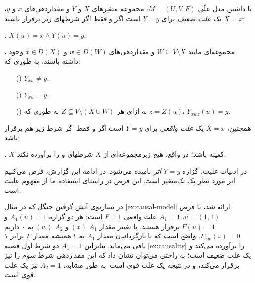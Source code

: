 \begin{definition}\label{def:causality}
  با داشتن مدل علّی
  $M=(U,V,F)$،
  مجموعه متغیرهای
  $X$ و $Y$
  و مقداردهی‌های
  $x$ و $y$،
  $X=x$
  یک
  \textit{علت ضعیف}
  برای
  $Y=y$
  است اگر و فقط اگر شرطهای زیر برقرار باشند:

  \textbf{.} $X(u)=x \wedge Y(u)=y$.

  \textbf{.}
  مجموعه‌ای مانند
  $W \subseteq V \setminus X$
  و مقداردهی‌های
  $w \in D(W)$ و $\bar{x} \in D(X)$
  وجود داشته باشند، به طوری که:
  \begin{itemize}
    \item[(\lr{a})] $Y_{\bar{x}w} \neq y$.
    \item[(\lr{b})] $Y_{xw}=y$.
    \item[(\lr{c})]
    به ازای هر
    $Z \subseteq V \setminus (X \cup W)$
    به طوری که
    $z = Z(u)$،
    $Y_{xwz}(u)=y$.
  \end{itemize}

  همچنین،
  $X=x$
  یک
  \textit{علت واقعی}
  برای
  $Y=y$
  است اگر و فقط اگر شرط زیر هم برقرار باشد:
  
  \textbf{.} $X$
  کمینه باشد؛ در واقع، هیچ زیرمجموعه‌ای از
  $X$
  شرطهای
   و 
  را برآورده نکند.
\end{definition}

در ادبیات علیت، گزاره
$Y=y$
\textit{اثر}
نامیده می‌شود.
در ادامه این گزارش، فرض می‌کنیم اثر مورد نظر
یک تک‌متغیر است. این فرض در راستای استفاده ما
از مفهوم علیت است.

\begin{example}\label{ex:causality}
  در سناریوی آتش گرفتن جنگل که در مثال
  \ref{ex:causal-model}
  ارائه شد، با فرض
  $u=(1,1)$،
  $A_1=1$
  علت واقعی
  $F=1$
  است: هر دو گزاره
  $A_1(u)=1$ و $F(u)=1$
  برقرار هستند.
  با تغییر مقدار
  $A_1$ $(\bar{x})$ و $A_2$ $(w)$
  به ۰
  داریم
  $F_{\bar{x}w}(u)=0$.
  واضح است که با بازگرداندن مقدار
  $A_1$ به ۱
  همیشه مقدار
  $F$
  برابر ۱ باقی می‌ماند.
  بنابراین
  $A_1=1$
  دو شرط اول قضیه
  \ref{ex:causality}
  را برآورده می‌کند و یک علت ضعیف است؛
  به راحتی می‌توان نشان داد که این مقداردهی
  شرط سوم را نیز برقرار می‌کند،
  و در نتیجه یک علت قوی است.
  به طور مشابه،
  $A_2=1$
  نیز یک علت قوی است.
\end{example}
